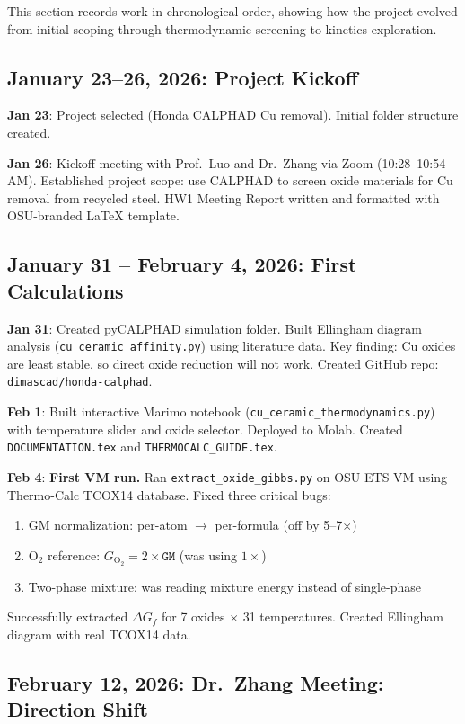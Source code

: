 \documentclass[11pt]{article}
\begin{document}
This section records work in chronological order, showing how the project evolved from initial scoping through thermodynamic screening to kinetics exploration.

\subsection{January 23--26, 2026: Project Kickoff}

\textbf{Jan 23}: Project selected (Honda CALPHAD Cu removal). Initial folder structure created.

\textbf{Jan 26}: Kickoff meeting with Prof.\ Luo and Dr.\ Zhang via Zoom (10:28--10:54 AM). Established project scope: use CALPHAD to screen oxide materials for Cu removal from recycled steel. HW1 Meeting Report written and formatted with OSU-branded LaTeX template.

\subsection{January 31 -- February 4, 2026: First Calculations}

\textbf{Jan 31}: Created pyCALPHAD simulation folder. Built Ellingham diagram analysis (\texttt{cu\_ceramic\_affinity.py}) using literature data. Key finding: Cu oxides are least stable, so direct oxide reduction will not work. Created GitHub repo: \texttt{dimascad/honda-calphad}.

\textbf{Feb 1}: Built interactive Marimo notebook (\texttt{cu\_ceramic\_thermodynamics.py}) with temperature slider and oxide selector. Deployed to Molab. Created \texttt{DOCUMENTATION.tex} and \texttt{THERMOCALC\_GUIDE.tex}.

\textbf{Feb 4}: \textbf{First VM run.} Ran \texttt{extract\_oxide\_gibbs.py} on OSU ETS VM using Thermo-Calc TCOX14 database. Fixed three critical bugs:
\begin{enumerate}[leftmargin=*]
    \item GM normalization: per-atom $\to$ per-formula (off by 5--7$\times$)
    \item O$_2$ reference: $G_{\text{O}_2} = 2 \times \texttt{GM}$ (was using $1\times$)
    \item Two-phase mixture: was reading mixture energy instead of single-phase
\end{enumerate}
Successfully extracted $\Delta G_f$ for 7 oxides $\times$ 31 temperatures. Created Ellingham diagram with real TCOX14 data.

\subsection{February 12, 2026: Dr.\ Zhang Meeting: Direction Shift}
\end{document}
